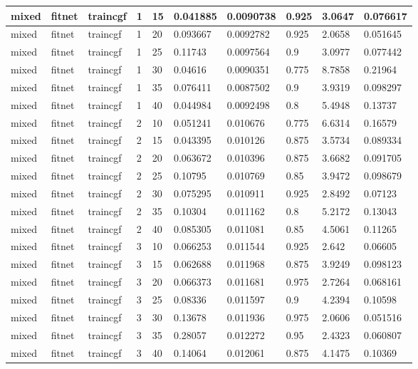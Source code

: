 \begin{longtable}{lllllllll}
mixed & fitnet & traincgf & 1 & 15 & 0.041885 & 0.0090738 & 0.925 & 3.0647 & 0.076617 \\ \hline 
mixed & fitnet & traincgf & 1 & 20 & 0.093667 & 0.0092782 & 0.925 & 2.0658 & 0.051645 \\ \hline 
mixed & fitnet & traincgf & 1 & 25 & 0.11743 & 0.0097564 & 0.9 & 3.0977 & 0.077442 \\ \hline 
mixed & fitnet & traincgf & 1 & 30 & 0.04616 & 0.0090351 & 0.775 & 8.7858 & 0.21964 \\ \hline 
mixed & fitnet & traincgf & 1 & 35 & 0.076411 & 0.0087502 & 0.9 & 3.9319 & 0.098297 \\ \hline 
mixed & fitnet & traincgf & 1 & 40 & 0.044984 & 0.0092498 & 0.8 & 5.4948 & 0.13737 \\ \hline 
mixed & fitnet & traincgf & 2 & 10 & 0.051241 & 0.010676 & 0.775 & 6.6314 & 0.16579 \\ \hline 
mixed & fitnet & traincgf & 2 & 15 & 0.043395 & 0.010126 & 0.875 & 3.5734 & 0.089334 \\ \hline 
mixed & fitnet & traincgf & 2 & 20 & 0.063672 & 0.010396 & 0.875 & 3.6682 & 0.091705 \\ \hline 
mixed & fitnet & traincgf & 2 & 25 & 0.10795 & 0.010769 & 0.85 & 3.9472 & 0.098679 \\ \hline 
mixed & fitnet & traincgf & 2 & 30 & 0.075295 & 0.010911 & 0.925 & 2.8492 & 0.07123 \\ \hline 
mixed & fitnet & traincgf & 2 & 35 & 0.10304 & 0.011162 & 0.8 & 5.2172 & 0.13043 \\ \hline 
mixed & fitnet & traincgf & 2 & 40 & 0.085305 & 0.011081 & 0.85 & 4.5061 & 0.11265 \\ \hline 
mixed & fitnet & traincgf & 3 & 10 & 0.066253 & 0.011544 & 0.925 & 2.642 & 0.06605 \\ \hline 
mixed & fitnet & traincgf & 3 & 15 & 0.062688 & 0.011968 & 0.875 & 3.9249 & 0.098123 \\ \hline 
mixed & fitnet & traincgf & 3 & 20 & 0.066373 & 0.011681 & 0.975 & 2.7264 & 0.068161 \\ \hline 
mixed & fitnet & traincgf & 3 & 25 & 0.08336 & 0.011597 & 0.9 & 4.2394 & 0.10598 \\ \hline 
mixed & fitnet & traincgf & 3 & 30 & 0.13678 & 0.011936 & 0.975 & 2.0606 & 0.051516 \\ \hline 
mixed & fitnet & traincgf & 3 & 35 & 0.28057 & 0.012272 & 0.95 & 2.4323 & 0.060807 \\ \hline 
mixed & fitnet & traincgf & 3 & 40 & 0.14064 & 0.012061 & 0.875 & 4.1475 & 0.10369 \\ \hline 

\end{longtable}
